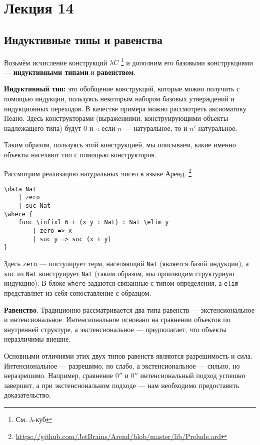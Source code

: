 \section{Лекция 14}

\newcommand{\ard}[1]{\texttt{#1}}

\subsection{Индуктивные типы и равенства}

Возьмём исчисление конструкций $\lambda C$ \footnote{См. $\lambda$-куб} и дополним его базовыми конструкциями --- \textbf{индуктивными типами} и \textbf{равенством}.

\medskip
\textbf{Индуктивный тип:} это обобщение конструкций, которые можно получить с помощью индукции,
пользуясь некоторым набором базовых утверждений и индукционных переходов. В качестве примера можно рассмотреть аксиоматику Пеано.
Здесь конструкторами (выражениями, конструирующими объекты надлежащего типа) будут $0$ и $_'$: если $n$ --- натуральное, то и $n'$ натуральное.

Таким образом, пользуясь этой конструкцией, мы описываем, какие именно объекты населяют тип с помощью конструкторов.

Рассмотрим реализацию натуральных чисел в языке Аренд. \footnote{\url{https://github.com/JetBrains/Arend/blob/master/lib/Prelude.ard}}
\begin{verbatim}
\data Nat
    | zero
    | suc Nat
\where {
    func \infixl 6 + (x y : Nat) : Nat \elim y
        | zero => x
        | suc y => suc (x + y)
}
\end{verbatim}

Здесь \ard{zero} --- постулирует терм, населяющий \ard{Nat} (является базой индукции), а \ard{suc} из \ard{Nat} конструирует \ard{Nat} (таким образом, мы производим структурную индукцию).
В блоке \ard{where} задаются связанные с типом определения, а \ard{elim} представляет из себя сопоставление с образцом.

\medskip
\textbf{Равенство}. Традиционно рассматривается два типа равенств --- экстенсиональное и интенсиональное.
Интенсиональное основано на сравнении объектов по внутренней структуре, а экстенсиональное --- предполагает, что объекты неразличимы внешне.

Основными отличиями этих двух типов равенств являются разрешимость и сила. Интенсиональное --- разрешимо, но слабо, а экстенсиональное --- сильно, но неразрешимо.
Например, сравнение $0''$ и $0''$ интенсиональный подход успешно завершит, а при экстенсиональном подходе --- нам необходимо предоставить доказательство.


